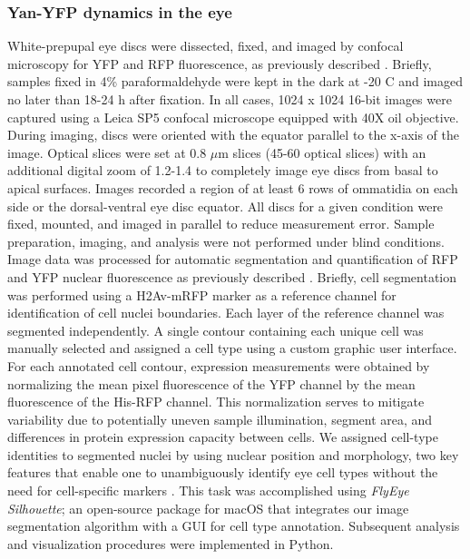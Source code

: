 \subsubsection{Yan-YFP dynamics in the eye}
\label{appendix:supp:metabolism:exp:yan}

White-prepupal eye discs were dissected, fixed, and imaged by confocal microscopy for YFP and RFP fluorescence, as previously described \cite{Pelaez2015a}. Briefly, samples fixed in 4\% paraformaldehyde were kept in the dark at -20 \textdegree{}C and imaged no later than 18-24 h after fixation. In all cases, 1024 x 1024 16-bit images were captured using a Leica SP5 confocal microscope equipped with 40X oil objective. During imaging, discs were oriented with the equator parallel to the x-axis of the image. Optical slices were set at 0.8 $\mu$m slices (45-60 optical slices) with an additional digital zoom of 1.2-1.4 to completely image eye discs from basal to apical surfaces. Images recorded a region of at least 6 rows of ommatidia on each side or the dorsal-ventral eye disc equator. All discs for a given condition were fixed, mounted, and imaged in parallel to reduce measurement error. Sample preparation, imaging, and analysis were not performed under blind conditions. Image data was processed for automatic segmentation and quantification of RFP and YFP nuclear fluorescence as previously described \cite{Pelaez2015a}. Briefly, cell segmentation was performed using a H2Av-mRFP marker as a reference channel for identification of cell nuclei boundaries. Each layer of the reference channel was segmented independently. A single contour containing each unique cell was manually selected and assigned a cell type using a custom graphic user interface. For each annotated cell contour, expression measurements were obtained by normalizing the mean pixel fluorescence of the YFP channel by the mean fluorescence of the His-RFP channel. This normalization serves to mitigate variability due to potentially uneven sample illumination, segment area, and differences in protein expression capacity between cells. We assigned cell-type identities to segmented nuclei by using nuclear position and morphology, two key features that enable one to unambiguously identify eye cell types without the need for cell-specific markers \cite{Wolff1993}. This task was accomplished using \textit{FlyEye Silhouette}; an open-source package for macOS that integrates our image segmentation algorithm with a GUI for cell type annotation. Subsequent analysis and visualization procedures were implemented in Python.

